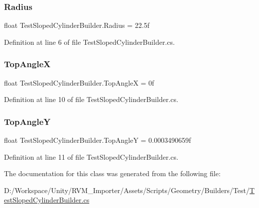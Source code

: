 \mbox{\label{class_test_sloped_cylinder_builder_abc7566777cbdcc1083686c92aa344481}} 
\subsubsection{\texorpdfstring{Radius}{Radius}}
{\footnotesize\ttfamily float Test\+Sloped\+Cylinder\+Builder.\+Radius = 22.\+5f}



Definition at line 6 of file Test\+Sloped\+Cylinder\+Builder.\+cs.

\mbox{\label{class_test_sloped_cylinder_builder_a6ed38c9d30e8bdaea84784b67fbf3d97}} 
\subsubsection{\texorpdfstring{TopAngleX}{TopAngleX}}
{\footnotesize\ttfamily float Test\+Sloped\+Cylinder\+Builder.\+Top\+AngleX = 0f}



Definition at line 10 of file Test\+Sloped\+Cylinder\+Builder.\+cs.

\mbox{\label{class_test_sloped_cylinder_builder_aae0ad5f365a7d0308bf73b470a1de593}} 
\subsubsection{\texorpdfstring{TopAngleY}{TopAngleY}}
{\footnotesize\ttfamily float Test\+Sloped\+Cylinder\+Builder.\+Top\+AngleY = 0.\+0003490659f}



Definition at line 11 of file Test\+Sloped\+Cylinder\+Builder.\+cs.



The documentation for this class was generated from the following file\+:\begin{DoxyCompactItemize}
\item 
D\+:/\+Workspace/\+Unity/\+R\+V\+M\+\_\+\+Importer/\+Assets/\+Scripts/\+Geometry/\+Builders/\+Test/\mbox{\hyperlink{_test_sloped_cylinder_builder_8cs}{Test\+Sloped\+Cylinder\+Builder.\+cs}}\end{DoxyCompactItemize}
